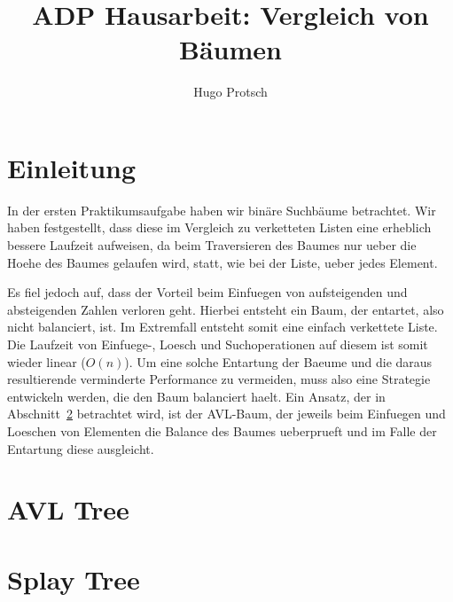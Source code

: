 \documentclass[11pt]{article}
\title{ADP Hausarbeit: Vergleich von Bäumen}
\author{Hugo Protsch}
\begin{document}
    \section{Einleitung}\label{sec:Einleitung}

    In der ersten Praktikumsaufgabe haben wir binäre Suchbäume betrachtet.
    Wir haben festgestellt, dass diese im Vergleich zu verketteten Listen eine erheblich
    bessere Laufzeit aufweisen, da beim Traversieren des Baumes nur ueber die
    Hoehe des Baumes gelaufen wird, statt, wie bei der Liste, ueber jedes Element.

    Es fiel jedoch auf, dass der Vorteil beim Einfuegen von aufsteigenden und
    absteigenden Zahlen verloren geht.
    Hierbei entsteht ein Baum, der entartet, also nicht balanciert, ist.
    Im Extremfall entsteht somit eine einfach verkettete Liste.
    Die Laufzeit von Einfuege-, Loesch und Suchoperationen auf diesem
    ist somit wieder linear (\(O(n)\)).
    Um eine solche Entartung der Baeume und die daraus resultierende verminderte Performance
    zu vermeiden, muss also eine Strategie entwickeln werden, die den Baum balanciert haelt.
    Ein Ansatz, der in Abschnitt~\ref{sec:avl-tree} betrachtet wird, ist der AVL-Baum,
    der jeweils beim Einfuegen und Loeschen von Elementen die
    Balance des Baumes ueberprueft und im Falle der Entartung diese ausgleicht.


    \section{AVL Tree}\label{sec:avl-tree}
    


    \section{Splay Tree}\label{sec:splay-tree}
    
\end{document}
